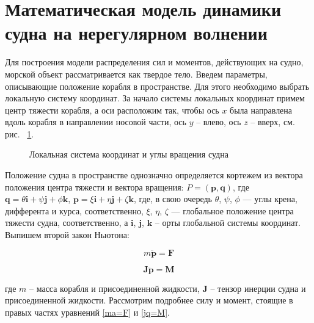 \section{Математическая модель динамики судна на нерегулярном волнении}
\label{math_ship}

Для построения модели распределения сил и моментов, действующих на судно, морской объект рассматривается как твердое тело. Введем параметры, описывающие положение корабля в пространстве. Для этого необходимо выбрать локальную систему координат. За начало системы локальных координат примем центр тяжести корабля, а оси расположим так, чтобы ось $x$ была направлена вдоль корабля в направлении носовой части, ось $y$ – влево, ось $z$ – вверх, см. рис. ~\ref{boat_axis}.

\begin{figure}[ht]
\begin{center}
\end{center}
\caption{Локальная система координат и углы вращения судна}
\label{boat_axis}
\end{figure}

Положение судна в пространстве однозначно определяется кортежем из вектора положения центра тяжести и вектора вращения: 
$P=(\mathbf{p},\mathbf{q})$, 
где  
$\mathbf{q}=\theta \mathbf{i}+\psi \mathbf{j}+\phi \mathbf{k}$, 
$\mathbf{p}=\xi \mathbf{i}+\eta \mathbf{j}+\zeta \mathbf{k}$, 
где, в свою очередь $\theta$, $\psi$, $\phi$ --- углы крена, дифферента и курса, соответственно, 
 $\xi$, $\eta$, $\zeta$ --- глобальное положение центра тяжести судна, соответственно, 
а $\mathbf{i}$, $\mathbf{j}$, $\mathbf{k}$ – орты глобальной системы координат. Выпишем второй закон Ньютона:

\begin{equation}
	m \ddot{\mathbf{p}} = \mathbf{F}
	\label{ma=F}
\end{equation}

\begin{equation}
	\mathbf{J}  \ddot{\mathbf{p}} = \mathbf{M}
	\label{jq=M}
\end{equation}

где $m$ – масса корабля и присоединенной жидкости, $\mathbf{J}$ – тензор инерции судна и присоединенной жидкости. Рассмотрим подробнее силу и момент, стоящие в правых частях уравнений \eqref{ma=F} и \eqref{jq=M}. 

